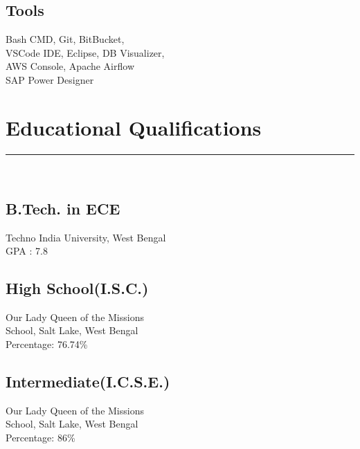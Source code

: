 \documentclass[]{class}
\begin{document}
\begin{minipage}[t]{0.33\textwidth}
\subsection{Tools}
Bash CMD, Git, BitBucket,\\
VSCode IDE, Eclipse, DB Visualizer,\\
AWS Console, Apache Airflow\\
SAP Power Designer
\sectionsep
\section{Educational Qualifications} 
\noindent\rule{5cm}{0.4pt}\\
\subsection{B.Tech. in ECE}
Techno India University, West Bengal \\
GPA : 7.8\\
\vspace{8pt}
\subsection{High School(I.S.C.)}
Our Lady Queen of the Missions\\
School, Salt Lake, West Bengal\\
Percentage: 76.74\%\\
\vspace{8pt}
\subsection{Intermediate(I.C.S.E.)}
Our Lady Queen of the Missions\\
School, Salt Lake, West Bengal\\
Percentage: 86\%
\sectionsep
%
%

\end{minipage} 
\hfill
\end{document}
